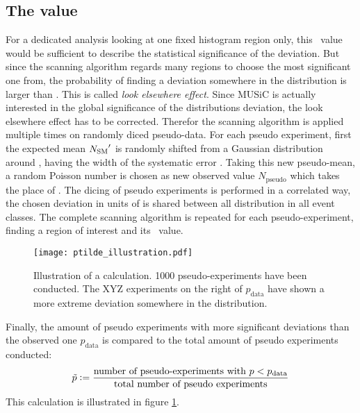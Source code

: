 \subsection{The \ptilde value}
For a dedicated analysis looking at one fixed histogram region only, this \p~value would be sufficient to describe the statistical significance of the deviation. But since the scanning algorithm regards many regions to choose the most significant one from, the probability of finding a deviation somewhere in the distribution is larger than \p. This is called \emph{look elsewhere effect}.
Since MUSiC is actually interested in the global significance of the distributions deviation, the look elsewhere effect has to be corrected.
Therefor the scanning algorithm is applied multiple times on randomly diced pseudo-data. For each pseudo experiment, first the expected mean ${N_\mathrm{SM}}'$ is randomly shifted from a Gaussian distribution around \Nmc, having the width of the systematic error \sigmamc. Taking this new pseudo-mean, a random Poisson number is chosen as new observed value $N_\mathrm{pseudo}$ which takes the place of \Ndata. The dicing of pseudo experiments is performed in a correlated way, the chosen deviation in units of \sigmamc is shared between all distribution in all event classes. The complete scanning algorithm is repeated for each pseudo-experiment, finding a region of interest and its \p~value.
\begin{figure}[htbp]
	\centering
	\texttt{[image: ptilde\_illustration.pdf]}
	\caption{Illustration of a \ptilde calculation. 1000 pseudo-experiments have been conducted. The XYZ experiments on the right of $p_\mathrm{data}$ have shown a more extreme deviation somewhere in the distribution.}
	\label{fig:ptilde_illustration}
\end{figure}
Finally, the amount of pseudo experiments with more significant deviations than the observed one $p_\mathrm{data}$ is compared to the total amount of pseudo experiments conducted:
\begin{equation}
	\tilde{p} \vcentcolon= \frac{\text{number of pseudo-experiments with } p < p_\mathrm{data}}{\text{total number of pseudo experiments}}
\end{equation}
This calculation is illustrated in figure \ref{fig:ptilde_illustration}.
